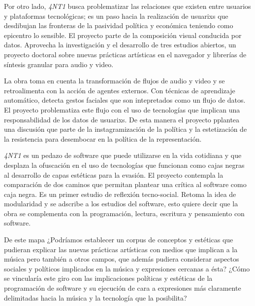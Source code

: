 \color{black}

Por otro lado, \textit{4NT1} busca problematizar las relaciones que existen entre usuarios y plataformas tecnológicas; es un paso hacia la realización de usuarixs que desdibujan las fronteras de la pasividad política y económica teniendo como epicentro lo sensible. El proyecto parte de la composición visual conducida por datos. Aprovecha la investigación y el desarrollo de tres estudios abiertos, un proyecto doctoral sobre nuevas prácticas artísticas en el navegador y librerías de síntesis granular para audio y video.

La obra toma en cuenta la transformación de flujos de audio y video y se retroalimenta con la acción de agentes externos. Con técnicas de aprendizaje automático, detecta gestos faciales que son intepretados como un flujo de datos. El proyecto problematiza este flujo con el uso de tecnologías que implican una responsabilidad de los datos de usuarixs. De esta manera el proyecto pplantea una discusión que parte de la instagramización de la política y la estetización de la resistencia para desembocar en la política de la representación.

\textit{4NT1} es un pedazo de software que puede utilizarse en la vida cotidiana y que desplaza la ofuscación en el uso de tecnologías que funcionan como cajas negras al desarrollo de capas estéticas para la evasión. El proyecto contempla la comparación de dos caminos que permitan plantear una crítica al software como caja negra. Es un primer estudio de reflexión tecno-social. Retoma la idea de modularidad y se adscribe a los estudios del software, esto quiere decir que la obra se complementa con la programación, lectura, escritura y pensamiento con software.

\color{MidnightBlue}

De este mapa ¿Podríamos establecer un corpus de conceptos y estéticas \citep{shankenCanon} que pudieran explicar las nuevas prácticas artísticas con medios que implican a la música pero también a otros campos, que además pudiera considerar aspectos sociales y políticos implicados en la música y expresiones cercanas a ésta? ¿Cómo se vincularía este giro con las implicaciones políticas y estéticas de la programación de software y su ejecución \citep{speakingCode} de cara a expresiones más claramente delimitadas hacia la música y la tecnología que la posibilita?

\color{black}
